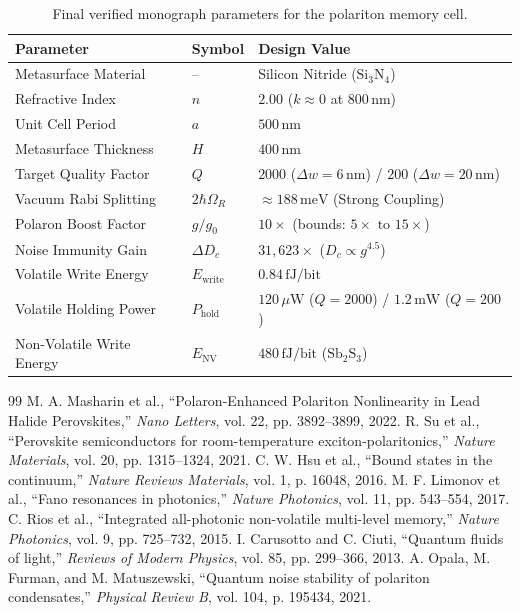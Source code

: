 \documentclass[11pt,oneside]{article}
\begin{document}
\begin{table}[htbp]
\centering
\caption{Final verified monograph parameters for the polariton memory cell.}
\begin{tabular}{lll}
\toprule
\textbf{Parameter} & \textbf{Symbol} & \textbf{Design Value} \\
\midrule
Metasurface Material & -- & Silicon Nitride ($\text{Si}_3\text{N}_4$) \\
Refractive Index & $n$ & $2.00$ ($k \approx 0$ at $800\,\text{nm}$) \\
Unit Cell Period & $a$ & $500\,\text{nm}$ \\
Metasurface Thickness & $H$ & $400\,\text{nm}$ \\
Target Quality Factor & $Q$ & $2000$ ($\Delta w = 6\,\text{nm}$) / $200$ ($\Delta w = 20\,\text{nm}$) \\
Vacuum Rabi Splitting & $2\hbar\Omega_R$ & $\approx 188\,\text{meV}$ (Strong Coupling) \\
Polaron Boost Factor & $g/g_0$ & $10\times$ (bounds: $5\times\text{ to }15\times$) \\
Noise Immunity Gain & $\Delta D_c$ & $31{,}623\times$ ($D_c \propto g^{4.5}$) \\
Volatile Write Energy & $E_{\text{write}}$ & $0.84\,\text{fJ/bit}$ \\
Volatile Holding Power & $P_{\text{hold}}$ & $120\,\mu\text{W}$ ($Q=2000$) / $1.2\,\text{mW}$ ($Q=200$) \\
Non-Volatile Write Energy & $E_{\text{NV}}$ & $480\,\text{fJ/bit}$ ($\text{Sb}_2\text{S}_3$) \\
\bottomrule
\end{tabular}
\end{table}

\begin{thebibliography}{99}
 M. A. Masharin et al., ``Polaron-Enhanced Polariton Nonlinearity in Lead Halide Perovskites,'' \textit{Nano Letters}, vol. 22, pp. 3892--3899, 2022.
 R. Su et al., ``Perovskite semiconductors for room-temperature exciton-polaritonics,'' \textit{Nature Materials}, vol. 20, pp. 1315--1324, 2021.
 C. W. Hsu et al., ``Bound states in the continuum,'' \textit{Nature Reviews Materials}, vol. 1, p. 16048, 2016.
 M. F. Limonov et al., ``Fano resonances in photonics,'' \textit{Nature Photonics}, vol. 11, pp. 543--554, 2017.
 C. Rios et al., ``Integrated all-photonic non-volatile multi-level memory,'' \textit{Nature Photonics}, vol. 9, pp. 725--732, 2015.
 I. Carusotto and C. Ciuti, ``Quantum fluids of light,'' \textit{Reviews of Modern Physics}, vol. 85, pp. 299--366, 2013.
 A. Opala, M. Furman, and M. Matuszewski, ``Quantum noise stability of polariton condensates,'' \textit{Physical Review B}, vol. 104, p. 195434, 2021.
\end{thebibliography}
\end{document}
